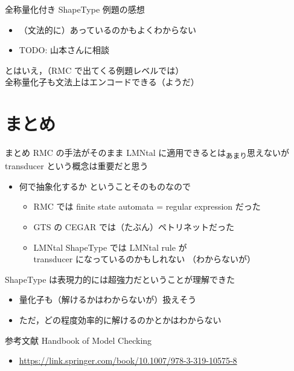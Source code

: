 \documentclass[presentation, xetex]{beamer}
\begin{document}
\begin{frame}[label={sec:orga9e7850}]{全称量化付き ShapeType}
例題の感想
\begin{itemize}
\item （文法的に）あっているのかもよくわからない
\item TODO: 山本さんに相談
\end{itemize}


とはいえ，（RMC で出てくる例題レベルでは）\\
全称量化子も文法上はエンコードできる（ようだ）
\end{frame}


\section{まとめ}
\label{sec:org753927b}

\begin{frame}[label={sec:org5e65862}]{まとめ}
RMC の手法がそのまま LMNtal に適用できるとは\textsubscript{あまり}思えないが\\
transducer という概念は重要だと思う
\begin{itemize}
\item \alert{\alert{何で抽象化するか}} ということそのものなので
\begin{itemize}
\item RMC では finite state automata = regular expression だった
\item GTS の CEGAR では（たぶん）ペトリネットだった
\item LMNtal ShapeType では LMNtal rule が \\
transducer になっているのかもしれない
（わからないが）
\end{itemize}
\end{itemize}


ShapeType は表現力的には超強力だということが理解できた
\begin{itemize}
\item 量化子も（解けるかはわからないが）扱えそう
\item ただ，どの程度効率的に解けるのかとかはわからない
\end{itemize}
\end{frame}


\begin{frame}[label={sec:org3ea43d1}]{参考文献}
Handbook of Model Checking
\begin{itemize}
\item \url{https://link.springer.com/book/10.1007/978-3-319-10575-8}
\end{itemize}
\end{frame}
\end{document}
